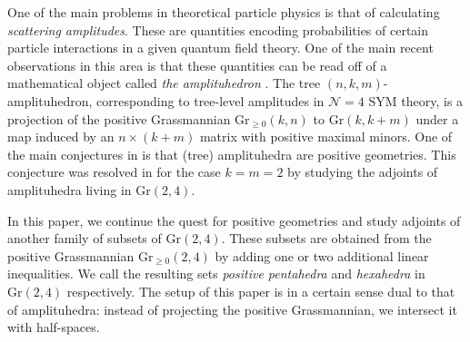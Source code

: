 \documentclass[12pt]{extarticle}
\theoremstyle{definition}
\begin{document}
One of the main problems in theoretical particle physics is that of calculating \emph{scattering amplitudes}. These are quantities encoding probabilities of certain particle interactions in a given quantum field theory. One of the main recent observations in this area is that these quantities can be read off of a mathematical object called \emph{the amplituhedron} \cite{arkani2014amplituhedron}. The tree $(n,k,m)$-amplituhedron, corresponding to tree-level amplitudes in $\mathcal{N}=4$ SYM theory, is a projection of the positive Grassmannian $\mathrm{Gr}_{\geq 0}(k,n)$ to $\mathrm{Gr}(k,k+m)$ under a map induced by an $n\times(k+m)$ matrix with positive maximal minors. One of the main conjectures in \cite{arkani2017positive} is that (tree) amplituhedra are positive geometries. This conjecture was resolved in \cite{ranestad2024adjoints} for the case $k=m=2$ by studying the adjoints of amplituhedra living in $\mathrm{Gr}(2,4)$. 

In this paper, we continue the quest for positive geometries and study adjoints of another family of subsets of $\mathrm{Gr}(2,4)$. These subsets are obtained from the positive Grassmannian $\mathrm{Gr}_{\geq 0}(2,4)$ by adding one or two additional linear inequalities. We call the resulting sets \emph{positive pentahedra} and \emph{hexahedra} in $\mathrm{Gr}(2,4)$ respectively. The setup of this paper is in a certain sense dual to that of amplituhedra: instead of projecting the positive Grassmannian, we intersect it with half-spaces. 

\end{document}
